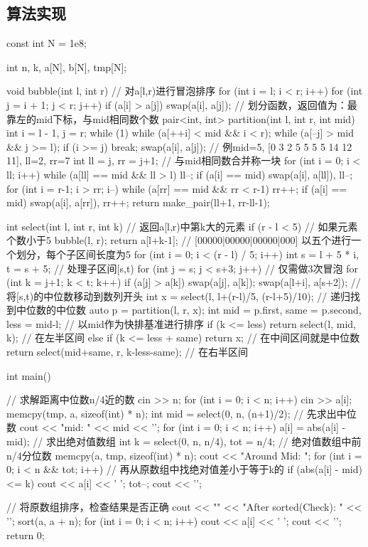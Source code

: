 \documentclass[12pt, a4paper, oneside]{ctexart}
\numberwithin{equation}{section}  %
\begin{document}
\subsection{算法实现}
\begin{cppcode}
const int N = 1e8;

int n, k, a[N], b[N], tmp[N];

void bubble(int l, int r) {  // 对a[l,r)进行冒泡排序
    for (int i = l; i < r; i++)
        for (int j = i + 1; j < r; j++)
            if (a[i] > a[j]) swap(a[i], a[j]);
}
// 划分函数，返回值为：最靠左的mid下标，与mid相同数个数
pair<int, int> partition(int l, int r, int mid) {
    int i = l - 1, j = r;
    while (1) {
        while (a[++i] < mid && i < r);
        while (a[--j] > mid && j >= l);
        if (i >= j) break;
        swap(a[i], a[j]);
    }
    // 例mid=5, [0 3 2 5 5 5 5 14 12 11], ll=2, rr=7
    int ll = j, rr = j+1;  // 与mid相同数合并称一块
    for (int i = 0; i < ll; i++) {
        while (a[ll] == mid && ll > l) ll--;
        if (a[i] == mid) swap(a[i], a[ll]), ll--;
    }
    for (int i = r-1; i > rr; i--) {
        while (a[rr] == mid && rr < r-1) rr++;
        if (a[i] == mid) swap(a[i], a[rr]), rr++;
    }
    return make_pair(ll+1, rr-ll-1);
}

int select(int l, int r, int k) {  // 返回a[l,r)中第k大的元素
    if (r - l < 5) { // 如果元素个数小于5
        bubble(l, r);
        return a[l+k-1];
    }
    // [00000|00000|00000|000]  以五个进行一个划分，每个子区间长度为5
    for (int i = 0; i < (r - l) / 5; i++) {
        int s = l + 5 * i, t = s + 5;  // 处理子区间[s,t)
        for (int j = s; j < s+3; j++)  // 仅需做3次冒泡
            for (int k = j+1; k < t; k++)
                if (a[j] > a[k]) swap(a[j], a[k]);
        swap(a[l+i], a[s+2]);  // 将[s,t)的中位数移动到数列开头
    }
    int x = select(l, l+(r-l)/5, (r-l+5)/10);  // 递归找到中位数的中位数
    auto p = partition(l, r, x);
    int mid = p.first, same = p.second, less = mid-l;  // 以mid作为快排基准进行排序
    if (k <= less) return select(l, mid, k);  // 在左半区间
    else if (k <= less + same) return x;  // 在中间区间就是中位数
    return select(mid+same, r, k-less-same);  // 在右半区间
}

int main() {  // 求解距离中位数n/4近的数
    cin >> n;
    for (int i = 0; i < n; i++) cin >> a[i];
    memcpy(tmp, a, sizeof(int) * n);
    int mid = select(0, n, (n+1)/2);  // 先求出中位数
    cout << "mid: " << mid << '\n';
    for (int i = 0; i < n; i++) a[i] = abs(a[i] - mid);  // 求出绝对值数组
    int k = select(0, n, n/4), tot = n/4;  // 绝对值数组中前n/4分位数
    memcpy(a, tmp, sizeof(int) * n);
    cout << "Around Mid: ";
    for (int i = 0; i < n && tot; i++)  // 再从原数组中找绝对值差小于等于k的
        if (abs(a[i] - mid) <= k) {
            cout << a[i] << ' ';
            tot--;
        }
    cout << '\n';

    // 将原数组排序，检查结果是否正确
    cout << "\n" << "After sorted(Check): " << '\n';
    sort(a, a + n);
    for (int i = 0; i < n; i++)
        cout << a[i] << ' ';
    cout << '\n';
    return 0;
}
\end{cppcode}
\end{document}
